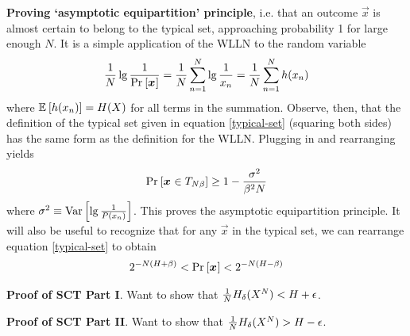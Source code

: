\documentclass[11pt]{article}
\begin{document}
\begin{compactitem}
	\item \textbf{Proving `asymptotic equipartition' principle}, i.e. that an outcome $\vec{x}$ is almost certain to belong to the typical set, approaching probability 1 for large enough $N$. It is a simple application of the WLLN to the random variable
	\begin{align}
		\frac{1}{N} \lg \frac{1}{ \text{Pr}_{}\left[\bm{x}_{}\right] } = \frac{1}{N} \sum_{n = 1}^{N} \lg \frac{1}{x_n} = \frac{1}{N} \sum_{n = 1}^{N} h(x_n)
	\end{align}
	where $\mathbb{E}_{}\left[h(x_n)\right] = H(X)$ for all terms in the summation. Observe, then, that the definition of the typical set given in equation \ref{typical-set} (squaring both sides) has the same form as the definition for the WLLN. Plugging in and rearranging yields
	\begin{align}
		\text{Pr}_{}\left[\bm{x}_{} \in T_{N\beta}\right] \ge 1 - \frac{\sigma^2}{\beta^2N}
	\end{align}
	where $\sigma^2 \equiv \mathrm{Var}\left[\lg\frac{1}{P(x_n)}\right]$. This proves the asymptotic equipartition principle. It will also be useful to recognize that for any $\vec x$ in the typical set, we can rearrange equation \ref{typical-set} to obtain
	\begin{align}
		2^{-N(H + \beta)} < \text{Pr}_{}\left[\bm{x}_{}\right] < 2^{-N(H - \beta)} \label{ts-range}
	\end{align}
	
	\item \textbf{Proof of SCT Part I}. Want to show that $\frac{1}{N} H_{\delta}(X^N) < H + \epsilon$. 


	\item \textbf{Proof of SCT Part II}. Want to show that $\frac{1}{N} H_{\delta}(X^N) > H - \epsilon$. 	
	
\end{compactitem}
\end{document}
